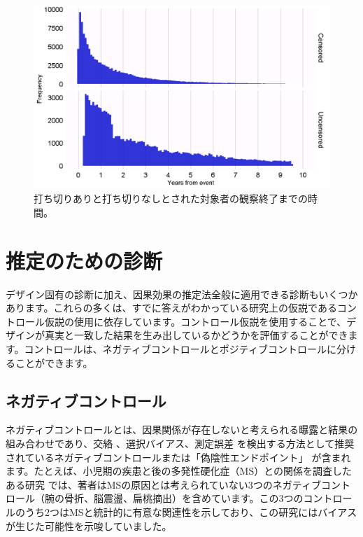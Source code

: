 \documentclass[
  11pt]{book}
\theoremstyle{definition}
\theoremstyle{definition}
\theoremstyle{definition}
\theoremstyle{definition}
\theoremstyle{remark}
\begin{document}
\begin{figure}

{\centering \includegraphics[width=1\linewidth]{images/MethodValidity/timeToObsEnd} 

}

\caption{打ち切りありと打ち切りなしとされた対象者の観察終了までの時間。}\label{fig:timeToObsEnd}
\end{figure}

\section{推定のための診断}\label{ux63a8ux5b9aux306eux305fux3081ux306eux8a3aux65ad}

デザイン固有の診断に加え、因果効果の推定法全般に適用できる診断もいくつかあります。これらの多くは、すでに答えがわかっている研究上の仮説であるコントロール仮説の使用に依存しています。コントロール仮説を使用することで、デザインが真実と一致した結果を生み出しているかどうかを評価することができます。コントロールは、ネガティブコントロールとポジティブコントロールに分けることができます。

\subsection{ネガティブコントロール}\label{NegativeControls}


ネガティブコントロールとは、因果関係が存在しないと考えられる曝露と結果の組み合わせであり、交絡 \citep{lipsitch_2010}、選択バイアス、測定誤差 \citep{arnold_2016} を検出する方法として推奨されているネガティブコントロールまたは「偽陰性エンドポイント」\citep{prased_2013} が含まれます。たとえば、小児期の疾患と後の多発性硬化症（MS）との関係を調査したある研究 \citep{zaadstra_2008} では、著者はMSの原因とは考えられていない3つのネガティブコントロール（腕の骨折、脳震盪、扁桃摘出）を含めています。この3つのコントロールのうち2つはMSと統計的に有意な関連性を示しており、この研究にはバイアスが生じた可能性を示唆していました。
\end{document}
